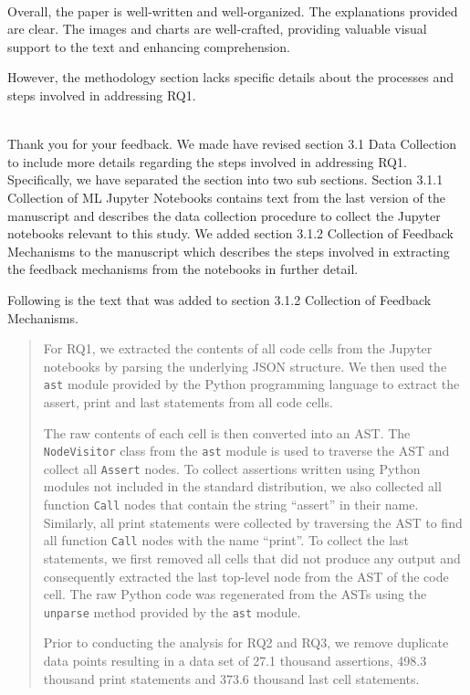 \documentclass[11pt,fleqn]{article}
\newcommand{\eline}{\vspace*{.75\baselineskip}}
\newcommand{\Referee}[1]{\eline \noindent {\bf Reviewer comment #1:} \\}
\newcommand{\Us}{\eline \noindent {\bf Response:}\\}
\newenvironment{revcomment}[1][]
{\Referee{#1}\begin{rcomment}}
{\end{rcomment}}
\begin{document}

\begin{revcomment}[1.7]
  Overall, the paper is well-written and well-organized. The explanations provided are clear. The images and charts are well-crafted, providing valuable visual support to the text and enhancing comprehension.

  However, the methodology section lacks specific details about the processes and steps involved in addressing RQ1.
\end{revcomment}

\Us Thank you for your feedback. We made have revised section 3.1 Data Collection to include more details regarding the steps involved in addressing RQ1. Specifically, we have separated the section into two sub sections. Section 3.1.1 Collection of ML Jupyter Notebooks contains text from the last version of the manuscript and describes the data collection procedure to collect the Jupyter notebooks relevant to this study. We added section 3.1.2 Collection of Feedback Mechanisms to the manuscript which describes the steps involved in extracting the feedback mechanisms from the notebooks in further detail.

Following is the text that was added to section 3.1.2 Collection of Feedback Mechanisms.

\begin{quote}
  For RQ1, we extracted the contents of all code cells from the Jupyter notebooks by parsing the underlying JSON structure. We then used the \texttt{ast} module provided by the Python programming language to extract the assert, print and last statements from all code cells.

  The raw contents of each cell is then converted into an AST. The \texttt{NodeVisitor} class from the \texttt{ast} module is used to traverse the AST and collect all \texttt{Assert} nodes. To collect assertions written using Python modules not included in the standard distribution, we also collected all function \texttt{Call} nodes that contain the string ``assert'' in their name. Similarly, all print statements were collected by traversing the AST to find all function \texttt{Call} nodes with the name ``print''. To collect the last statements, we first removed all cells that did not produce any output and consequently extracted the last top-level node from the AST of the code cell. The raw Python code was regenerated from the ASTs using the \texttt{unparse} method provided by the \texttt{ast} module.

  Prior to conducting the analysis for RQ2 and RQ3, we remove duplicate data points resulting in a data set of 27.1 thousand assertions, 498.3 thousand print statements and 373.6 thousand last cell statements.
\end{quote}
\end{document}
